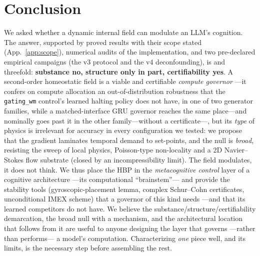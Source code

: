 \documentclass{article}
\begin{document}
\section{Conclusion}
We asked whether a dynamic internal field can modulate an LLM's cognition. The
answer, supported by proved results with their scope stated
(App.~\ref{app:scope}), numerical audits of the implementation, and two
pre-declared empirical campaigns (the v3 protocol and the v4 deconfounding),
is
and threefold: \textbf{substance no, structure only in part, certifiability
yes}. A second-order homeostatic field is a viable and certifiable \emph{compute
governor} ---it confers on compute allocation an out-of-distribution robustness
that the \texttt{gating\_wm} control's learned halting policy does not have, in
one of two generator families, while a matched-interface GRU governor reaches
the same place---and nominally goes past it in the other family---without a
certificate---, but its \emph{type} of physics is irrelevant for accuracy in
every configuration we tested: we propose that the gradient laminates temporal
demand to set-points, and the
null is \emph{broad}, resisting the sweep of local physics, Poisson-type
non-locality and a 2D Navier--Stokes flow substrate (closed by an
incompressibility limit). The field modulates, it does not think. We thus place
the HBP in the \emph{metacognitive control} layer of a cognitive architecture
---its computational ``brainstem''--- and provide the stability tools
(gyroscopic-placement lemma, complex Schur--Cohn certificates, unconditional
IMEX scheme) that a governor of this kind needs ---and that its learned
competitors do not have. We believe the substance/structure/certifiability
demarcation, the broad null with a mechanism, and the architectural location
that follows from it are useful to anyone designing the layer that governs
---rather than performs--- a model's computation.
Characterizing \emph{one} piece well, and its limits, is the necessary step
before assembling the rest.
\end{document}
